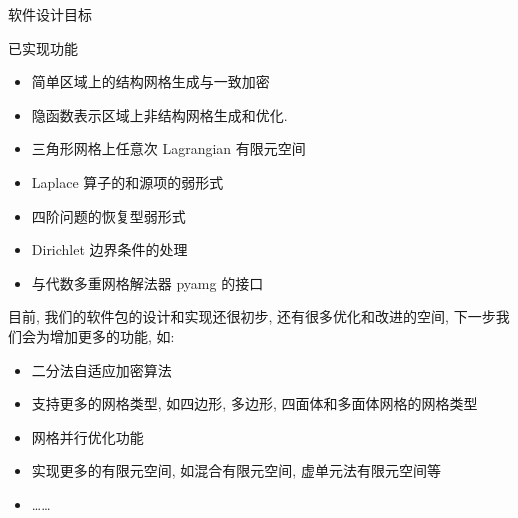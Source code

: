 \begin{frame}{软件设计目标}
\begin{frame}{已实现功能}
\begin{itemize}
\tightlist
\item
  简单区域上的结构网格生成与一致加密
\item
  隐函数表示区域上非结构网格生成和优化.
\item
  三角形网格上任意次 Lagrangian 有限元空间
\item
  Laplace 算子的和源项的弱形式
\item
  四阶问题的恢复型弱形式
\item
  Dirichlet 边界条件的处理
\item
  与代数多重网格解法器 pyamg 的接口
\end{itemize}
\end{frame}


目前, 我们的软件包的设计和实现还很初步, 还有很多优化和改进的空间,
下一步我们会为增加更多的功能, 如:

\begin{itemize}
\tightlist
\item
  二分法自适应加密算法
\item
  支持更多的网格类型, 如四边形, 多边形, 四面体和多面体网格的网格类型
\item
  网格并行优化功能
\item
  实现更多的有限元空间, 如混合有限元空间, 虚单元法有限元空间等
\item
  \ldots{}\ldots{}
\end{itemize}
\end{frame}

